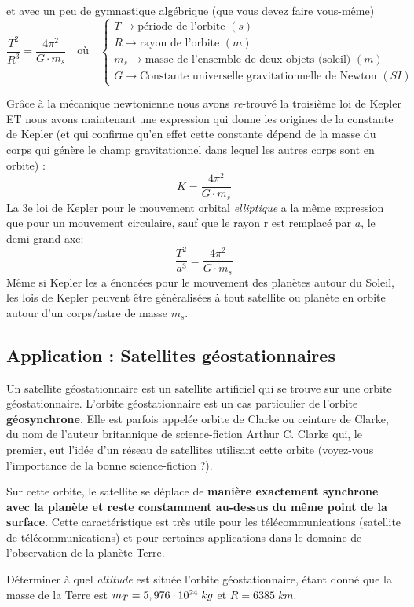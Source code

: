 \documentclass[11pt,a4paper]{article}
\begin{document}
et avec un peu de gymnastique algébrique (que vous devez faire vous-même)
\[ \dfrac{T^2}{R^3} = \dfrac{4\pi^2}{G\cdot m_s} \quad \text{où} \quad 
\begin{cases}
T \rightarrow \text{période de l'orbite }(s) \\
R \rightarrow \text{rayon de l'orbite } (m) \\
m_s \rightarrow \text{masse de l'ensemble de deux objets (soleil) } (m) \\
G \rightarrow \text{Constante universelle gravitationnelle de Newton } (SI)
\end{cases}\]

Grâce à la mécanique newtonienne nous avons \textit{re}-trouvé la troisième loi de Kepler ET nous avons maintenant une expression qui donne les origines de la constante de Kepler (et qui confirme qu'en effet cette constante dépend de la masse du corps qui génère le champ gravitationnel dans lequel les autres corps sont en orbite) : 
\[ K =  \dfrac{4\pi^2}{G\cdot m_s}       \]
La 3e loi de Kepler pour le mouvement orbital \textit{elliptique} a la même expression que pour un mouvement circulaire, sauf que le rayon r est remplacé par $a$, le demi-grand axe:
\[ \dfrac{T^2}{a^3} = \dfrac{4\pi^2}{G\cdot m_s}\]
Même si Kepler les a énoncées pour le mouvement des planètes autour du Soleil, les lois de Kepler peuvent être généralisées à tout satellite ou planète en orbite autour d’un corps/astre de masse $m_s$.  

\subsection{Application : Satellites géostationnaires }

Un satellite géostationnaire est un satellite artificiel qui se trouve sur une orbite géostationnaire. L’orbite géostationnaire  est un cas particulier de l’orbite \textbf{géosynchrone}. Elle est parfois appelée orbite de Clarke ou ceinture de Clarke, du nom de l’auteur britannique de science-fiction Arthur C. Clarke qui, le premier, eut l’idée d’un réseau de satellites utilisant cette orbite (voyez-vous l’importance de la bonne science-fiction ?). 

Sur cette orbite, le satellite se déplace de \textbf{manière exactement synchrone avec la planète et reste constamment au-dessus du même point de la surface}. Cette caractéristique est très utile pour les télécommunications (satellite de télécommunications) et pour certaines applications dans le domaine de l’observation de la planète Terre.

\begin{exo}
Déterminer à quel \textit{altitude} est située l'orbite géostationnaire, étant donné que la masse de la Terre est $m_T = 5,976\cdot10^{24}\; kg$ et $R=6385\; km$.
\vspace{4cm}
\end{exo}
\end{document}
